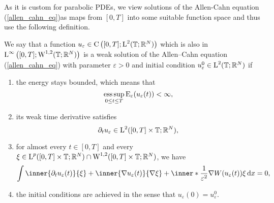 As it is custom for parabolic PDEs, we view solutions of the Allen-Cahn equation (\ref{allen_cahn_eq})as maps from $ [0,T] $ into some suitable function space and thus use the following definition.

\begin{definition}
	\label{solution_to_ac}
	We say that a function 
	$ u_{ \varepsilon} \in 
	\mathrm{ C } \left( [0 , T ] ; \operatorname{L}^{ 2 } ( \operatorname{\mathbb{T}}; \mathbb{ R }^{ N } ) \right) $
	which is also in
	$\operatorname{L}^{ \infty } \left( [0, T ]; \operatorname{W}^{ 1, 2 } ( \operatorname{\mathbb{T}} ; \mathbb{ R }^{ N } ) \right)
	$
	is a weak solution of the Allen--Cahn equation (\ref{allen_cahn_eq}) with parameter $ \varepsilon > 0 $ and initial condition $ u_{ \varepsilon}^{ 0 } \in \operatorname{L}^{ 2 } ( \operatorname{\mathbb{T}} ; \mathbb{ R }^{ N } ) $ if
	\begin{enumerate}
		\item the energy stays bounded, which means that
		\begin{equation}
			\operatorname*{ess\,sup}_{ 0 \leq t \leq T }
				\operatorname{E}_{ \varepsilon } ( u_{ \varepsilon } ( t ) ) 
			< \infty,
		\end{equation}
		\item 
		its weak time derivative satisfies
		\begin{equation}
			\partial_{ t } u_{ \varepsilon }
			\in
			\operatorname{L}^{ 2 } ( [ 0 , T ] \times \operatorname{\mathbb{T}} ; \mathbb{ R }^{ N } ),
		\end{equation}
		\item 
		for almost every $ t \in [ 0 , T ] $ and every 
		$ \xi \in \operatorname{L}^{ p } ( [ 0 , T ] \times \operatorname{\mathbb{T}}; \mathbb{ R }^{ N } ) 
		\cap
		\operatorname{W}^{ 1, 2 } ( [ 0, T ] \times \operatorname{\mathbb{T}} ; \mathbb{ R }^{ N } ) $,
		we have
		\begin{equation}
			\label{ac_weak_equation}
			\int
				\inner{\partial_{ t } u_{ \varepsilon} ( t ) }{ \xi }
				+
				\inner{ \nabla u_{ \varepsilon } ( t ) }{ \nabla \xi } 
				+
				\inner*{ \frac{ 1 }{ \varepsilon^{ 2 } } \nabla W ( u_{ \varepsilon} ( t ) ) }{ \xi }
			\dd{x}
			=
			0,
		\end{equation}
		\item 
		the initial conditions are achieved in the sense that $ u_{ \varepsilon } ( 0 ) = u_{ \varepsilon}^{ 0 } $.
	\end{enumerate}
\end{definition}

